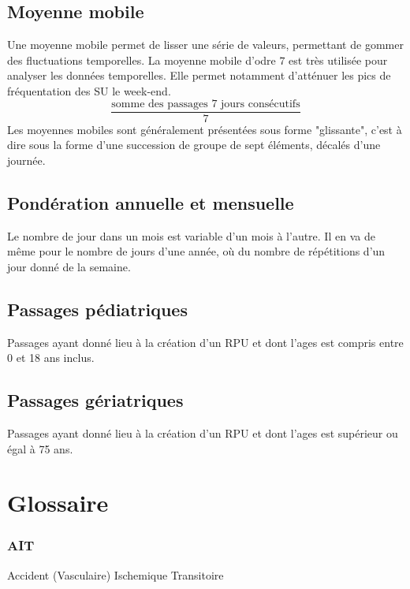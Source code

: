 \documentclass[12pt,english,french,twoside]{report}\usepackage[]{graphicx}\usepackage[]{color}
\begin{document}
\section*{Moyenne mobile}
Une moyenne mobile permet de lisser une série de valeurs, permettant de gommer des fluctuations temporelles. La moyenne mobile d'odre $7$ est très utilisée pour analyser les données temporelles. Elle permet notamment d'atténuer les pics de fréquentation des SU le week-end.
\begin{displaymath}
    \frac{\text{somme des passages 7 jours consécutifs}}{7}
\end{displaymath}
Les moyennes mobiles sont généralement présentées sous forme "glissante", c'est à dire sous la forme d'une succession de groupe de sept éléments, décalés d'une journée.

\section*{Pondération annuelle et mensuelle}
Le nombre de jour dans un mois est variable d'un mois à l'autre. Il en va de même pour le nombre de jours d'une année, où du nombre de répétitions d'un jour donné de la semaine.

\section*{Passages pédiatriques}
Passages ayant donné lieu à la création d'un RPU et dont l'ages est compris entre 0 et 18 ans inclus.

\section*{Passages gériatriques}
Passages ayant donné lieu à la création d'un RPU et dont l'ages est supérieur ou égal à 75 ans.



\newpage
\chapter{Glossaire}





\subsection*{AIT}
Accident (Vasculaire) Ischemique Transitoire
\end{document}
